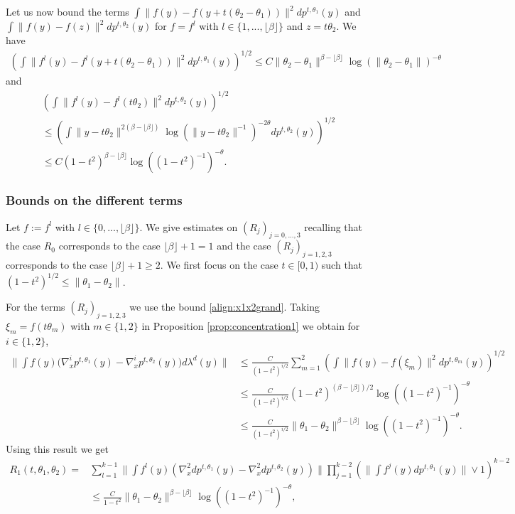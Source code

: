 \documentclass{article}
\begin{document}
Let us now bound the terms
$\int\|f(y)-f(y+t(\theta_2-\theta_1))\|^2dp^{t,\theta_1}(y)$ and $\int\|f(y)-f(z)\|^2dp^{t,\theta_2}(y)$ for $f=f^l$ with $l\in \{1,...,\lfloor \beta \rfloor\}$ and $z=t\theta_2$. We have 
\begin{align}\label{align:allerundernierp}
    \left(\int \|f^l(y)-f^l(y+t(\theta_2-\theta_1))\|^2dp^{t,\theta_1}(y)\right)^{1/2}\leq C \|\theta_2-\theta_1\|^{\beta-\lfloor \beta \rfloor}\log(\|\theta_2-\theta_1\|)^{-\theta}
\end{align}
and 
\begin{align}\label{align:concentrationcas1easy}
    &\left(\int \|f^l(y)-f^l(t\theta_2)\|^2dp^{t,\theta_2}(y)\right)^{1/2}\nonumber\\ & \leq \left(\int \|y-t\theta_2\|^{2(\beta-\lfloor \beta \rfloor)}\log(\|y-t\theta_2\|^{-1})^{-2\theta}dp^{t,\theta_2}(y)\right)^{1/2}\nonumber\\
    & \leq C (1-t^2)^{\beta-\lfloor \beta \rfloor}\log((1-t^2)^{-1})^{-\theta}.
\end{align}



\subsubsection{Bounds on the different terms}\label{sec:bounddifftermi}
Let $f:=f^{l}$ with $l\in \{0,...,\lfloor \beta \rfloor\}$. We give estimates on $(R_j)_{j=0,...,3}$ recalling that the case $R_0$ corresponds to the case $\lfloor \beta \rfloor +1= 1$ and the case  $(R_j)_{j=1,2,3}$ corresponds to the case $\lfloor \beta \rfloor +1\geq 2$. We first focus on the case $t\in [0,1)$ such that $(1-t^2)^{1/2}\leq \|\theta_1-\theta_2\|$. 

For the terms $(R_j)_{j=1,2,3}$ we use the bound \eqref{align:x1x2grand}. Taking $\xi_m=f(t\theta_m)$ with $m\in \{1,2\}$ in Proposition \ref{prop:concentration1} we obtain for $i\in\{1,2\}$,
\begin{align*}
     \|\int f(y)\big(\nabla^i_x p^{t,\theta_1}(y)-\nabla^i_x p^{t,\theta_2}(y)\big)d\lambda^d(y)\|& \leq \frac{C}{(1-t^2)^{i/2}}\sum_{m=1}^2\left(\int \|f(y)-f(\xi_m)\|^2dp^{t,\theta_m}(y)\right)^{1/2}\\
     & \leq \frac{C}{(1-t^2)^{i/2}}(1-t^2)^{(\beta-\lfloor \beta \rfloor)/2}\log((1-t^2)^{-1})^{-\theta}\\
     & \leq \frac{C}{(1-t^2)^{i/2}}\|\theta_1-\theta_2\|^{\beta-\lfloor \beta \rfloor}\log((1-t^2)^{-1})^{-\theta}.
\end{align*}
Using this result we get
\begin{align*}
    R_1(t,\theta_1,\theta_2)= & \sum_{l=1}^{k-1} \|\int f^{l}(y)(\nabla^2_x dp^{t,\theta_1}(y)-\nabla^2_x dp^{t,\theta_2}(y))\| \prod_{j=1}^{k-2}\left(\|\int f^{j}(y) dp^{t,\theta_1}(y)\|\vee 1\right)^{k-2}\\
    & \leq \frac{C}{1-t^2}\|\theta_1-\theta_2\|^{\beta-\lfloor \beta \rfloor}\log((1-t^2)^{-1})^{-\theta},
\end{align*}
\end{document}

